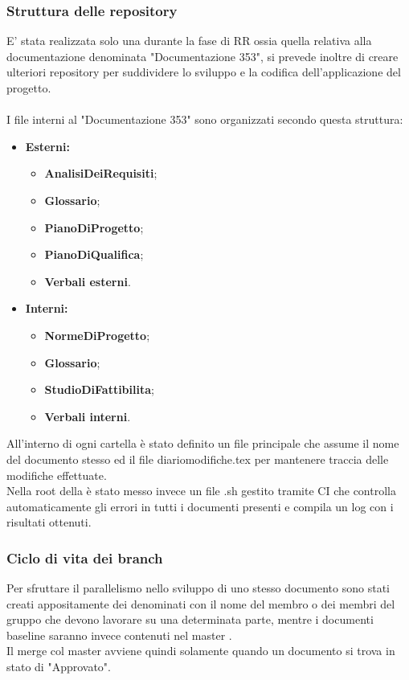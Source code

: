 \documentclass[NormeDiProgetto.tex]{subfiles}
\begin{document}
	\subsubsection{Struttura delle repository}
	E' stata realizzata solo una  durante la fase di RR ossia quella relativa alla documentazione denominata "Documentazione 353", si prevede inoltre di creare ulteriori repository per suddividere lo sviluppo e la codifica dell'applicazione del progetto. \\\\
	I file interni al  "Documentazione 353" sono organizzati secondo questa struttura:
	\begin{itemize}
		\item \textbf{Esterni:}
				\begin{itemize}
				\item \textbf{AnalisiDeiRequisiti};
				\item \textbf{Glossario};
				\item \textbf{PianoDiProgetto};
				\item \textbf{PianoDiQualifica};
				\item \textbf{Verbali esterni}.
			\end{itemize}
		\item \textbf{Interni:}
				\begin{itemize}
					\item \textbf{NormeDiProgetto};
					\item \textbf{Glossario};
					\item \textbf{StudioDiFattibilita};
					\item \textbf{Verbali interni}.
				\end{itemize}		
	\end{itemize}	
	All'interno di ogni cartella è stato definito un file  principale che assume il nome del documento stesso ed il file diariomodifiche.tex per mantenere traccia delle modifiche effettuate.\\
	Nella root della  è stato messo invece un file .sh gestito tramite  CI che controlla automaticamente gli errori in tutti i documenti presenti e compila un log con i risultati ottenuti.
	
	\subsubsection{Ciclo di vita dei branch}
	Per sfruttare il parallelismo nello sviluppo di uno stesso documento sono stati creati appositamente dei  denominati con il nome del membro o dei membri del gruppo che devono lavorare su una determinata parte, mentre i documenti baseline saranno invece contenuti nel master .\\
	Il merge col master avviene quindi solamente quando un documento si trova in stato di "Approvato".
	
\end{document}
